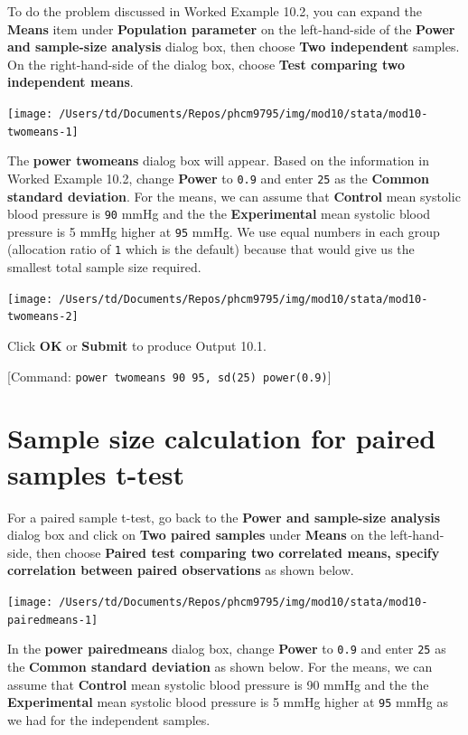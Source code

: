 \documentclass[
]{memoir}
\begin{document}
To do the problem discussed in Worked Example 10.2, you can expand the \textbf{Means} item under \textbf{Population parameter} on the left-hand-side of the \textbf{Power and sample-size analysis} dialog box, then choose \textbf{Two independent} samples. On the right-hand-side of the dialog box, choose \textbf{Test comparing two independent means}.

\texttt{[image: /Users/td/Documents/Repos/phcm9795/img/mod10/stata/mod10-twomeans-1]}

The \textbf{power twomeans} dialog box will appear. Based on the information in Worked Example 10.2, change \textbf{Power} to \texttt{0.9} and enter \texttt{25} as the \textbf{Common standard deviation}. For the means, we can assume that \textbf{Control} mean systolic blood pressure is \texttt{90} mmHg and the the \textbf{Experimental} mean systolic blood pressure is 5 mmHg higher at \texttt{95} mmHg. We use equal numbers in each group (allocation ratio of \texttt{1} which is the default) because that would give us the smallest total sample size required.

\texttt{[image: /Users/td/Documents/Repos/phcm9795/img/mod10/stata/mod10-twomeans-2]}

Click \textbf{OK} or \textbf{Submit} to produce Output 10.1.

{[}Command: \texttt{power\ twomeans\ 90\ 95,\ sd(25)\ power(0.9)}{]}

\hypertarget{sample-size-calculation-for-paired-samples-t-test}{%
\section{Sample size calculation for paired samples t-test}\label{sample-size-calculation-for-paired-samples-t-test}}

For a paired sample t-test, go back to the \textbf{Power and sample-size analysis} dialog box and click on \textbf{Two paired samples} under \textbf{Means} on the left-hand-side, then choose \textbf{Paired test comparing two correlated means, specify correlation between paired observations} as shown below.

\texttt{[image: /Users/td/Documents/Repos/phcm9795/img/mod10/stata/mod10-pairedmeans-1]}

In the \textbf{power pairedmeans} dialog box, change \textbf{Power} to \texttt{0.9} and enter \texttt{25} as the \textbf{Common standard deviation} as shown below. For the means, we can assume that \textbf{Control} mean systolic blood pressure is 90 mmHg and the the \textbf{Experimental} mean systolic blood pressure is 5 mmHg higher at \texttt{95} mmHg as we had for the independent samples.
\end{document}
